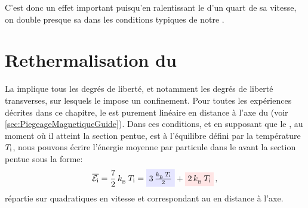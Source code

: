 C'est donc un effet important puisqu'en ralentissant le \jat d'un quart de sa vitesse, on double presque sa \templong dans les conditions typiques de notre \setup.

\section{Rethermalisation du \jat}
La \reth implique tous les degrés de liberté, et notamment les degrés de liberté transverses, sur lesquels le \gm impose un confinement. Pour toutes les expériences décrites dans ce chapitre, le \ppt est purement linéaire en distance à l'axe du \gm (voir \autoref{sec:PiegeageMagnetiqueGuide}).
Dans ces conditions, et en supposant que le \jat, au moment où il atteint la section pentue, est à l'équilibre \thdy défini par la température $T_{\rm i}$, nous pouvons écrire l'énergie \thiq moyenne par particule dans le \gm avant la section pentue sous la forme:
\begin{equation}
\Moyenne{\Eatini} = \frac{7}{2}\,\kb\,\Teqini = 
	\ArriveeHiglightColorMath{blue}{3 \, \frac{\kb\,\Teqini}{2}}
	+ \ArriveeHiglightColorMath{red}{2 \, \kb\,\Teqini}
	\virguleformule
	\label{eq:EatiniPente}
\end{equation}
répartie sur  quadratiques en vitesse et  correspondant au \pctlin en distance à l'axe.



